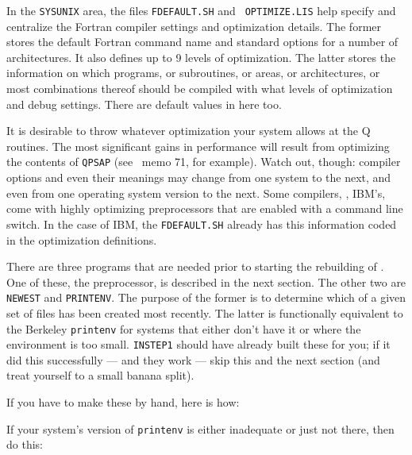 In the {\tt\dol SYSUNIX} area, the files {\tt FDEFAULT.SH} and {\tt
OPTIMIZE.LIS} help specify and centralize the Fortran compiler settings
and optimization details.  The former stores the default Fortran command
name and standard options for a number of architectures.  It also
defines up to 9 levels of optimization.  The latter stores the
information on which programs, or subroutines, or areas, or
architectures, or most combinations thereof should be compiled with what
levels of optimization and debug settings.  There are default values in
here too.

It is desirable to throw whatever optimization your system allows at the
Q routines.  The most significant gains in performance will result from
optimizing the contents of {\tt \dol QPSAP} (see \AIPS\ memo 71, for
example).  Watch out, though: compiler options and even their meanings
may change from one system to the next, and even from one operating
system version to the next.  Some compilers, \eg, IBM's, come with
highly optimizing preprocessors that are enabled with a command line
switch.  In the case of IBM, the {\tt FDEFAULT.SH} already has this
information coded in the optimization definitions. \medskip


There are three programs that are needed prior to starting the
rebuilding of \AIPS.  One of these, the preprocessor, is described in
the next section.  The other two are {\tt NEWEST} and {\tt PRINTENV}.
The purpose of the former is to determine which of a given set of files
has been created most recently.  The latter is functionally equivalent
to the Berkeley {\tt printenv} for systems that either don't have it or
where the environment is too small.  {\tt INSTEP1} should have already
built these for you; if it did this successfully --- and they work ---
skip this and the next section (and treat yourself to a small banana
split).

If you have to make these by hand, here is how: \medskip

\medskip

\noindent If your system's version of {\tt printenv} is either
inadequate or just not there, then do this:\medskip

\medskip

